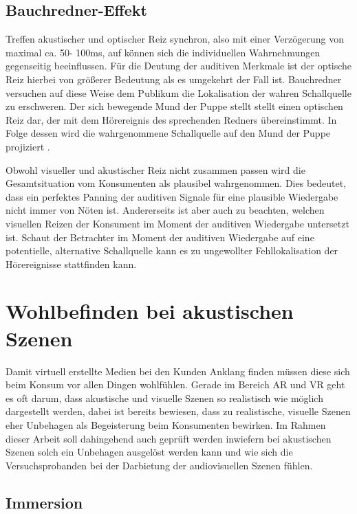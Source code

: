 \subsection{Bauchredner-Effekt}

Treffen akustischer und optischer Reiz synchron, also mit einer Verzögerung von maximal ca. 50- 100ms,  auf können sich die individuellen Wahrnehmungen gegenseitig beeinflussen. Für die Deutung der auditiven Merkmale ist der optische Reiz hierbei von größerer Bedeutung als es umgekehrt der Fall ist. Bauchredner versuchen auf diese Weise dem Publikum die Lokalisation der wahren Schallquelle zu erschweren. Der sich bewegende Mund der Puppe stellt stellt einen optischen Reiz dar, der mit dem Hörereignis des sprechenden Redners übereinstimmt. In Folge dessen wird die wahrgenommene Schallquelle auf den Mund der Puppe projiziert \cite[S.163]{Genuit10}.

Obwohl visueller und akustischer Reiz nicht zusammen passen wird die Gesamtsituation vom Konsumenten als plausibel wahrgenommen. Dies bedeutet, dass ein perfektes Panning der auditiven Signale für eine plausible Wiedergabe nicht immer von Nöten ist. Andererseits ist aber auch zu beachten, welchen visuellen Reizen der Konsument im Moment der auditiven Wiedergabe untersetzt ist. Schaut der Betrachter im Moment der auditiven Wiedergabe auf eine potentielle, alternative Schallquelle  kann es zu ungewollter Fehllokalisation der Hörereignisse stattfinden kann.



\section{Wohlbefinden bei akustischen Szenen}
Damit virtuell erstellte Medien bei den Kunden Anklang finden müssen diese sich beim Konsum vor allen Dingen wohlfühlen. Gerade im Bereich AR und VR geht es oft darum, dass akustische und visuelle Szenen so realistisch wie möglich dargestellt werden, dabei ist bereits bewiesen, dass zu realistische, visuelle Szenen eher Unbehagen als Begeisterung beim Konsumenten bewirken. Im Rahmen dieser Arbeit soll dahingehend auch geprüft werden inwiefern bei akustischen Szenen solch ein Unbehagen ausgelöst werden kann und wie sich die Versuchsprobanden bei der Darbietung der audiovisuellen Szenen fühlen. 

 \subsection{Immersion}
 
